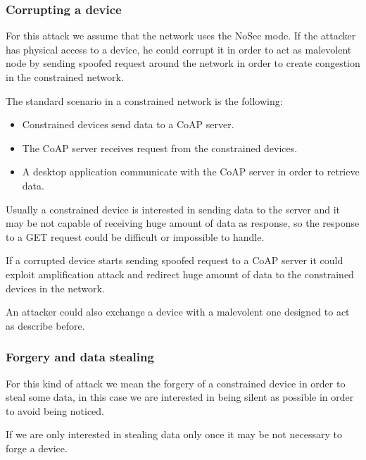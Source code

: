 	\subsubsection{Corrupting a device}
	For this attack we assume that the network uses the NoSec mode.\newline
	If the attacker has physical access to a device, he could corrupt it in order to act as malevolent node by sending spoofed request around the network in order to create congestion in the constrained network.\newline
	
	The standard scenario in a constrained network is the following:
	\begin{itemize}
		\item Constrained devices send data to a CoAP server.
		\item The CoAP server receives request from the constrained devices.
		\item A desktop application communicate with the CoAP server in order to retrieve data.
	\end{itemize}

	Usually a constrained device is interested in sending data to the server and it may be not capable of receiving huge amount of data as response, so the response to a GET request could be difficult or impossible to handle.\newline
	
	If a corrupted device starts sending spoofed request to a CoAP server it could exploit amplification attack and redirect huge amount of data to the constrained devices in the network.\newline
	
	An attacker could also exchange a device with a malevolent one designed to act as describe before.\newline
	
	\subsubsection{Forgery and data stealing}
	For this kind of attack we mean the forgery of a constrained device in order to steal some data, in this case we are interested in being silent as possible in order to avoid being noticed.\newline
	
	If we are only interested in stealing data only once it may be not necessary to forge a device.\newline
	
